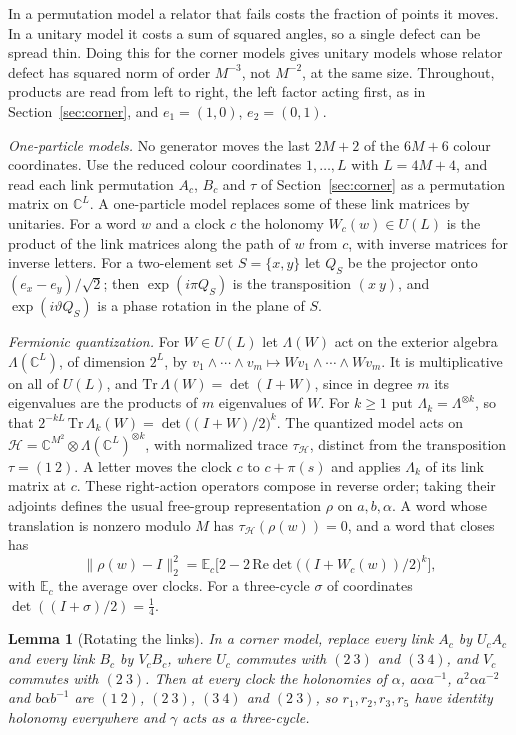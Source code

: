 \documentclass[11pt,a4paper]{article}
\theoremstyle{plain}
\newtheorem{lemma}[theorem]{Lemma}
\theoremstyle{definition}
\theoremstyle{remark}
\begin{document}
In a permutation model a relator that fails costs the fraction of points it moves. In a unitary model it costs a sum of squared
angles, so a single defect can be spread thin. Doing this for the corner models gives unitary models whose relator defect has squared norm of order $M^{-3}$, not $M^{-2}$, at the same size. Throughout, products are read from left to right, the left factor acting first,
as in Section~\ref{sec:corner}, and $e_1=(1,0)$, $e_2=(0,1)$.

\emph{One-particle models.} No generator moves the last $2M+2$ of the $6M+6$ colour coordinates. Use the reduced colour coordinates $1,\dots,L$ with $L=4M+4$, and read each link permutation $A_c$, $B_c$
and $\tau$ of Section~\ref{sec:corner} as a permutation matrix on $\mathbb C^L$. A one-particle model replaces some of these link matrices
by unitaries. For a word $w$ and a clock $c$ the holonomy $W_c(w)\in U(L)$ is the product of the link matrices along the path of $w$ from
$c$, with inverse matrices for inverse letters. For a two-element set $S=\{x,y\}$ let $Q_S$ be the projector onto
$(e_x-e_y)/\sqrt2$; then $\exp(i\pi Q_S)$ is the transposition $(x\ y)$, and $\exp(i\vartheta Q_S)$ is a phase rotation in the plane of $S$.

\emph{Fermionic quantization.} For $W\in U(L)$ let $\Lambda(W)$ act on the exterior algebra $\Lambda(\mathbb C^L)$, of dimension $2^L$,
by $v_1\wedge\cdots\wedge v_m\mapsto Wv_1\wedge\cdots\wedge Wv_m$. It is multiplicative on all of $U(L)$, and
$\mathrm{Tr}\,\Lambda(W)=\det(I+W)$, since in degree $m$ its eigenvalues are the products of $m$ eigenvalues of $W$. For $k\ge1$ put
$\Lambda_k=\Lambda^{\otimes k}$, so that $2^{-kL}\,\mathrm{Tr}\,\Lambda_k(W)=\det\big((I+W)/2\big)^k$. The quantized model acts on $\mathcal H=\mathbb C^{M^2}\otimes\Lambda(\mathbb C^L)^{\otimes k}$, with normalized trace $\tau_{\mathcal H}$, distinct from the transposition $\tau=(1\ 2)$. A letter moves the clock $c$ to
$c+\pi(s)$ and applies $\Lambda_k$ of its link matrix at $c$. These right-action operators compose in reverse order; taking their adjoints defines the usual free-group representation $\rho$ on $a,b,\alpha$. A word whose translation is nonzero
modulo $M$ has $\tau_{\mathcal H}(\rho(w))=0$, and a word that closes has
\[
\|\rho(w)-I\|_2^2=\mathbb E_c\Big[2-2\,\mathrm{Re}\det\big((I+W_c(w))/2\big)^k\Big],
\]
with $\mathbb E_c$ the average over clocks. For a three-cycle $\sigma$ of coordinates $\det((I+\sigma)/2)=\frac14$.

\begin{lemma}[Rotating the links]\label{lem:rotations}
In a corner model, replace every link $A_c$ by $U_cA_c$ and every link $B_c$ by $V_cB_c$, where $U_c$ commutes with $(2\ 3)$ and
$(3\ 4)$, and $V_c$ commutes with $(2\ 3)$. Then at every clock the holonomies of $\alpha$, $a\alpha a^{-1}$, $a^2\alpha a^{-2}$ and
$b\alpha b^{-1}$ are $(1\ 2)$, $(2\ 3)$, $(3\ 4)$ and $(2\ 3)$, so $r_1,r_2,r_3,r_5$ have identity holonomy everywhere and $\gamma$ acts
as a three-cycle.
\end{lemma}
\end{document}
